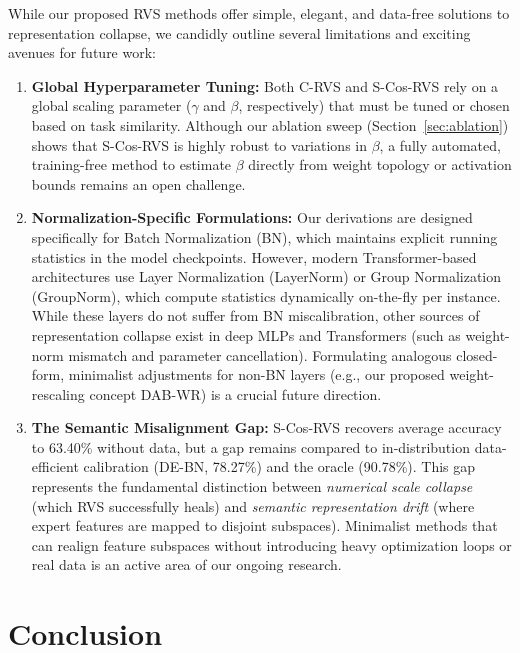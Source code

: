 \documentclass{article}
\theoremstyle{plain}
\theoremstyle{definition}
\theoremstyle{remark}
\begin{document}
While our proposed RVS methods offer simple, elegant, and data-free solutions to representation collapse, we candidly outline several limitations and exciting avenues for future work:
\begin{enumerate}
    \item \textbf{Global Hyperparameter Tuning:} Both C-RVS and S-Cos-RVS rely on a global scaling parameter ($\gamma$ and $\beta$, respectively) that must be tuned or chosen based on task similarity. Although our ablation sweep (Section~\ref{sec:ablation}) shows that S-Cos-RVS is highly robust to variations in $\beta$, a fully automated, training-free method to estimate $\beta$ directly from weight topology or activation bounds remains an open challenge.
    \item \textbf{Normalization-Specific Formulations:} Our derivations are designed specifically for Batch Normalization (BN), which maintains explicit running statistics in the model checkpoints. However, modern Transformer-based architectures use Layer Normalization (LayerNorm) or Group Normalization (GroupNorm), which compute statistics dynamically on-the-fly per instance. While these layers do not suffer from BN miscalibration, other sources of representation collapse exist in deep MLPs and Transformers (such as weight-norm mismatch and parameter cancellation). Formulating analogous closed-form, minimalist adjustments for non-BN layers (e.g., our proposed weight-rescaling concept DAB-WR) is a crucial future direction.
    \item \textbf{The Semantic Misalignment Gap:} S-Cos-RVS recovers average accuracy to 63.40\% without data, but a gap remains compared to in-distribution data-efficient calibration (DE-BN, 78.27\%) and the oracle (90.78\%). This gap represents the fundamental distinction between \emph{numerical scale collapse} (which RVS successfully heals) and \emph{semantic representation drift} (where expert features are mapped to disjoint subspaces). Minimalist methods that can realign feature subspaces without introducing heavy optimization loops or real data is an active area of our ongoing research.
\end{enumerate}

\section{Conclusion}
\label{sec:conclusion}
\end{document}
